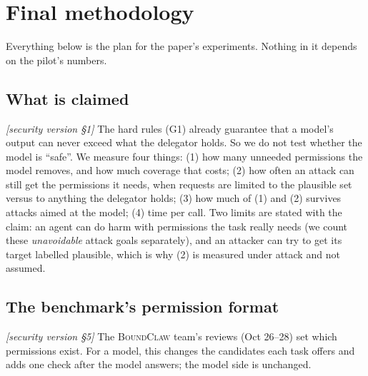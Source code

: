 \documentclass[10pt]{article}
\newcommand{\BC}{{\mdseries\textsc{BoundClaw}}}
\newcommand{\M}[1]{\textit{[security version #1]}}
\begin{document}
\section{Final methodology}\label{sec:final}
Everything below is the plan for the paper's experiments. Nothing in it depends on the pilot's numbers.

\subsection{What is claimed}
\M{\S1}
The hard rules (G1) already guarantee that a model's output can never exceed what the delegator holds. So we do not test
whether the model is ``safe''. We measure four things: (1) how many unneeded permissions the model removes, and how much
coverage that costs; (2) how often an attack can still get the permissions it needs, when requests are limited to the
plausible set versus to anything the delegator holds; (3) how much of (1) and (2) survives attacks aimed at the model; (4)
time per call. Two limits are stated with the claim: an agent can do harm with permissions the task really needs (we
count these \emph{unavoidable} attack goals separately), and an attacker can try to get its target labelled plausible,
which is why (2) is measured under attack and not assumed.

\subsection{The benchmark's permission format}\label{sec:format}
\M{\S5}
The \BC{} team's reviews (Oct 26--28) set which permissions exist. For a model, this changes the candidates each task
offers and adds one check after the model answers; the model side is unchanged.
\end{document}
